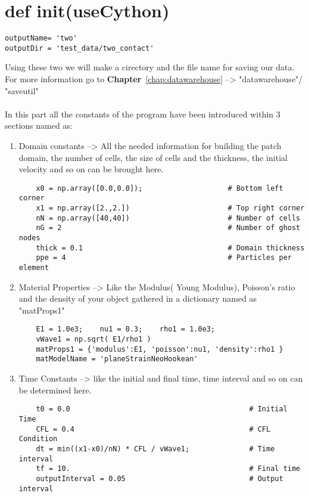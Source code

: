 \documentclass[11pt,fleqn]{book} %
\begin{document}
\section{def init(useCython)}

\begin{lstlisting}
outputName= 'two'
outputDir = 'test_data/two_contact'
\end{lstlisting}

Using these two we will make a cirectory and the file name for saving our data. For more information go to \textbf{Chapter}~\ref{chap:datawarehouse} --> "datawarehouse"/ "saveutil"\\ \\

In this part all the constants of the program have been introduced within 3 sections named as:

\begin{enumerate}

\item Domain constants --> All the needed information for building the patch domain, the number of cells, the size of cells and the thickness, the initial velocity and so on can be brought here.

\begin{lstlisting}
    x0 = np.array([0.0,0.0]);                    # Bottom left corner
    x1 = np.array([2.,2.])                       # Top right corner
    nN = np.array([40,40])                       # Number of cells
    nG = 2                                       # Number of ghost nodes
    thick = 0.1                                  # Domain thickness
    ppe = 4                                      # Particles per element
\end{lstlisting}


\item Material Properties --> Like the Modulus( Young Modulus), Poisson's ratio and the density of your object gathered in a dictionary named as "matProps1"
\begin{lstlisting}
    E1 = 1.0e3;    nu1 = 0.3;    rho1 = 1.0e3;    
    vWave1 = np.sqrt( E1/rho1 )
    matProps1 = {'modulus':E1, 'poisson':nu1, 'density':rho1 }
    matModelName = 'planeStrainNeoHookean'
\end{lstlisting}

\item Time Constants --> like the initial and final time, time interval and so on can be determined here.
\begin{lstlisting}
    t0 = 0.0                                          # Initial Time
    CFL = 0.4                                         # CFL Condition
    dt = min((x1-x0)/nN) * CFL / vWave1;              # Time interval
    tf = 10.                                          # Final time
    outputInterval = 0.05                             # Output interval
\end{lstlisting}

\end{enumerate}
\end{document}
